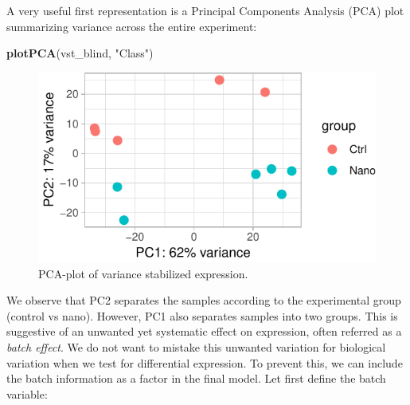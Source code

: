 \documentclass[9pt,a4paper,]{extarticle}
\newenvironment{Shaded}{\begin{snugshade}}{\end{snugshade}}
\newcommand{\KeywordTok}[1]{\textcolor[rgb]{0.13,0.29,0.53}{\textbf{{#1}}}}
\newcommand{\StringTok}[1]{\textcolor[rgb]{0.31,0.60,0.02}{{#1}}}
\newcommand{\NormalTok}[1]{{#1}}
\begin{document}
A very useful first representation is a Principal Components Analysis (PCA) plot summarizing variance across the entire experiment:

\begin{Shaded}
\begin{Highlighting}[]
\KeywordTok{plotPCA}\NormalTok{(vst_blind, }\StringTok{"Class"}\NormalTok{)}
\end{Highlighting}
\end{Shaded}

\begin{figure}

{\centering \includegraphics{CAGEWorkflow_files/figure-latex/PCA-1} 

}

\caption{PCA-plot of variance stabilized expression.}\label{fig:PCA}
\end{figure}

We observe that PC2 separates the samples according to the experimental group (control vs nano). However, PC1 also separates samples into two groups. This is suggestive of an unwanted yet systematic effect on expression, often referred as a \emph{batch effect}. We do not want to mistake this unwanted variation for biological variation when we test for differential expression. To prevent this, we can include the batch information as a factor in the final model. Let first define the batch variable:
\end{document}
